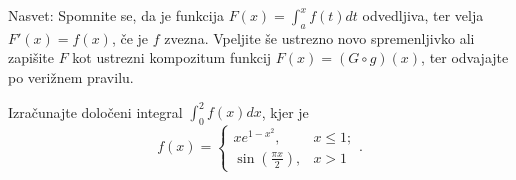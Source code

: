 \documentclass[11pt,a4paper]{exam}
\renewcommand{\leq}{\leqslant} %
\renewcommand{\{}{\lbrace}
\renewcommand{\}}{\rbrace}
\begin{document}
\begin{questions}
				Nasvet: Spomnite se, da je funkcija $F(x) = \int_{a}^{x} f(t) dt$ odvedljiva, ter velja $F'(x) = f(x)$, če je $f$ zvezna. Vpeljite še ustrezno novo spremenljivko ali zapišite $F$ kot ustrezni kompozitum funkcij $F(x) = (G \circ g)(x)$, ter odvajajte po verižnem pravilu.

				\question Izračunajte določeni integral $\int_{0}^{2}f(x) dx$, kjer je 
				\[f(x) = \begin{cases}
					x e^{1-x^{2}}, & x \leq 1; \\
					\sin\left( \frac{\pi x}{2} \right), & x > 1
				\end{cases}.\]

\end{questions}




\end{document}
